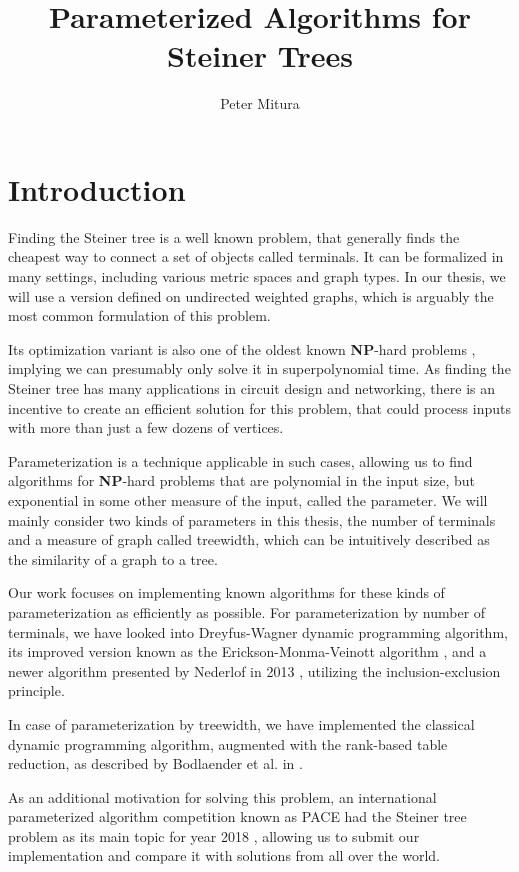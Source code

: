 \documentclass[thesis=M,english,hidelinks]{FITthesis}[2012/10/20]
\title{Parameterized Algorithms for Steiner Trees}
\author{Peter Mitura}
\theoremstyle{definition}
\newcommand{\NPH}{\textbf{NP}-hard\xspace}
\begin{document}
\chapter{Introduction}

Finding the Steiner tree is a well known problem, that generally finds the cheapest way to connect a set of
objects called terminals. It can be formalized in many settings, including various metric spaces and graph types. In
our thesis, we will use a version defined on undirected weighted graphs, which is arguably the most common formulation
of this problem.

Its optimization variant is also one of the oldest known \NPH problems \cite{Karp1972}, implying we can presumably only
solve it in superpolynomial time. As finding the Steiner tree has many applications in circuit design and networking,
there is an incentive to create an efficient solution for this problem, that could process inputs with more than just a
few dozens of vertices.

Parameterization is a technique applicable in such cases, allowing us to find algorithms for \NPH problems that are
polynomial in the input size, but exponential in some other measure of the input, called the parameter. We will mainly
consider two kinds of parameters in this thesis, the number of terminals and a measure of graph called treewidth, which
can be intuitively described as the similarity of a graph to a tree.

Our work focuses on implementing known algorithms for these kinds of parameterization as efficiently as possible.  For
parameterization by number of terminals, we have looked into Dreyfus-Wagner \cite{Dreyfus1971} dynamic programming
algorithm, its improved version known as the Erickson-Monma-Veinott algorithm \cite{Erickson1987}, and a newer algorithm
presented by Nederlof in 2013 \cite{Nederlof2013}, utilizing the inclusion-exclusion principle.

In case of parameterization by treewidth, we have implemented the classical dynamic programming algorithm, augmented
with the rank-based table reduction, as described by Bodlaender et al. in \cite{Bodlaender2012}.

As an additional motivation for solving this problem, an international parameterized algorithm competition known as
PACE had the Steiner tree problem as its main topic for year 2018 \cite{PaceReport}, allowing us to submit our
implementation and compare it with solutions from all over the world.
\end{document}
